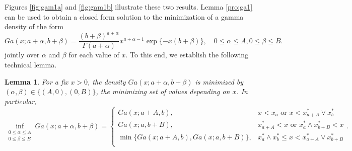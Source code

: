 \documentclass[12pt]{article}
\newtheorem{lemma}{Lemma}[section]
\begin{document}
Figures \ref{fig:gam1a} and \ref{fig:gam1b} illustrate these two results. Lemma \ref{pro:ga1} can be used to obtain a closed form solution to the minimization of a gamma density of the form
\begin{equation}
	\label{eq:ga}
	Ga(x;a+\alpha,b+\beta) = \frac{(b+\beta)^{a+\alpha}}{\Gamma(a+\alpha)}x^{a+\alpha-1}\exp\{-x(b+\beta)\}, \quad 0\le\alpha\le A, 0\le\beta\le B.
\end{equation}
jointly over $\alpha$ and $\beta$ for each value of $x$. To this end, we establish the following technical lemma.
\begin{lemma}	
	\label{pro:ga2}
	For a fix $x>0$, the density $Ga(x;a+\alpha,b+\beta)$ is minimized by $(\alpha, \beta) \in \{(A, 0), (0, B)\}$, the minimizing set of values depending on $x$. In particular,	
	$$\inf_{\begin{aligned}
			0\le \alpha\le A \\ 0\le \beta\le B
	\end{aligned}}Ga(x;a+\alpha,b+\beta) = 
	\begin{cases}
		Ga(x;a+A,b)                     , & x<x_a         \text{ or } x<x_{a+A}^* \vee x_b^*\\
		Ga(x;a,b+B)                     , & x_{a+A}^* < x \text{ or } x_a^* \wedge x_{b+B}^* < x\\
		\min\{Ga(x;a+A,b), Ga(x;a,b+B)\}, & x_a^* \wedge x_b^*\le x < x_{a+A}^* \vee x_{b+B}^*\\
	\end{cases}.$$
\end{lemma}
\end{document}
